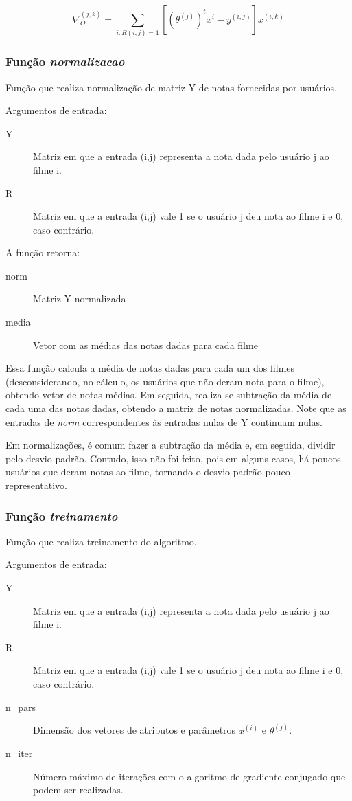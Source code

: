 \documentclass[12pt]{article}
\begin{document}
\begin{equation} \label{eq_grad_theta}
\nabla_{\Theta}^{(j,k)} = \sum_{i:R(i,j)=1} \left[\left(\theta^{(j)}\right)^t x^i - y^{(i,j)}\right]x^{(i,k)}
\end{equation}

\subsubsection{Função \textit{normalizacao}}
Função que realiza normalização de matriz Y de notas fornecidas por usuários.

Argumentos de entrada:

\begin{description}
\item[Y] Matriz em que a entrada (i,j) representa a nota dada pelo usuário j ao filme i.
\item[R] Matriz em que a entrada (i,j) vale 1 se o usuário j deu nota ao filme i e 0, caso contrário.
\end{description}

A função retorna:

\begin{description}
\item[norm] Matriz Y normalizada
\item[media] Vetor com as médias das notas dadas para cada filme
\end{description}

Essa função calcula a média de notas dadas para cada um dos filmes (desconsiderando, no cálculo, os usuários que não deram nota para o filme), obtendo vetor de notas médias. Em seguida, realiza-se subtração da média de cada uma das notas dadas, obtendo a matriz de notas normalizadas. Note que as entradas de \textit{norm} correspondentes às entradas nulas de Y continuam nulas.

Em normalizações, é comum fazer a subtração da média e, em seguida, dividir pelo desvio padrão. Contudo, isso não foi feito, pois em alguns casos, há poucos usuários que deram notas ao filme, tornando o desvio padrão pouco representativo.

\subsubsection{Função \textit{treinamento}}
Função que realiza treinamento do algoritmo.

Argumentos de entrada:

\begin{description}
\item[Y] Matriz em que a entrada (i,j) representa a nota dada pelo usuário j ao filme i.
\item[R] Matriz em que a entrada (i,j) vale 1 se o usuário j deu nota ao filme i e 0, caso contrário.
\item[n\_pars] Dimensão dos vetores de atributos e parâmetros $x^{(i)}$ e $\theta^{(j)}$.
\item[n\_iter] Número máximo de iterações com o algoritmo de gradiente conjugado que podem ser realizadas. 
\end{description}
\end{document}
